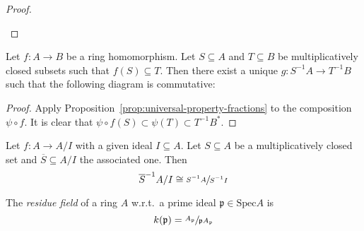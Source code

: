 \begin{theorem}
\begin{proof}
\begin{itemize}
                \end{itemize}

            \end{proof}
        \end{theorem}


        \begin{prop}
            Let $f:A \longrightarrow B$ be a ring homomorphism.
            Let $S \subseteq A$ and $T \subseteq B$ be
            multiplicatively closed subsets such that $f(S) \subseteq T$.
            Then there exist a unique $g: S^{-1}A \longrightarrow T^{-1}B$
            such that the following diagram is commutative:
            \begin{center}
            \end{center}
        \end{prop}
            \begin{proof}

                Apply Proposition~\ref{prop:universal-property-fractions} to the composition $\psi \circ f$.
                It is clear that  $\psi \circ f(S) \subset \psi(T) \subset T^{-1}B^*$.

            \end{proof}

        \begin{corollary}
            Let $f:A \longrightarrow A/I$ with a given ideal $I \subseteq A$.
            Let $S \subseteq A$ be a multiplicatively closed set and $\overline{S} \subseteq A/I$ the associated one.
            Then
            \[
                \overline{S}^{-1}A/I \cong \sfrac{S^{-1}A}{S^{-1}I}  %
            \]
        \end{corollary}

        \begin{defn}
            The \emph{residue field} of a ring $A$ w.r.t.\ a prime ideal $\mathfrak{p} \in\text{Spec}A$ is
            \[
                k(\mathfrak{p}) = \sfrac{A_{\mathfrak{p}}}{\mathfrak{p}A_{\mathfrak{p}}}
            \]
        \end{defn}

